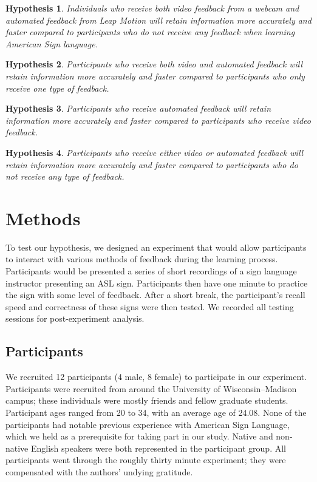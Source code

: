 \documentclass{sigchi}
\newtheorem{hyp}{Hypothesis}
\begin{document}
\begin{hyp}
Individuals who receive both video feedback from a webcam and automated feedback from Leap Motion will retain information more accurately and faster compared to participants who do not receive any feedback when learning  American Sign language.
\end{hyp}

\begin{hyp}
Participants who receive both video and automated feedback will retain information more accurately and faster compared to participants who only receive one type of feedback. 
\end{hyp}

\begin{hyp}
 Participants who receive automated feedback will retain information more accurately and faster compared to participants who receive video feedback.  
\end{hyp}

\begin{hyp}
 Participants who receive either video or automated feedback will retain information more accurately and faster compared to participants who do not receive any type of feedback.
\end{hyp}

\section{Methods}
To test our hypothesis, we designed an experiment that would allow participants to interact with various methods of feedback during the learning process.  Participants would be presented a series of short recordings of a sign language instructor presenting an ASL sign.  Participants then have one minute to practice the sign with some level of feedback. After a short break, the participant’s recall speed and correctness of these signs were then tested. We recorded all testing sessions for post-experiment analysis.   
 
\subsection{Participants}

We recruited 12 participants (4 male, 8 female) to participate in our experiment. Participants were recruited from around the University of Wisconsin–Madison campus; these individuals were mostly friends and fellow graduate students. Participant ages ranged from 20 to 34, with an average age of 24.08.  None of the participants had notable previous experience with American Sign Language, which we held as a prerequisite for taking part in our study. Native and non-native English speakers were both represented in the participant group.  All participants went through the roughly thirty minute experiment; they were compensated with the authors' undying gratitude.  
\end{document}
